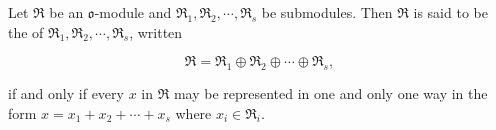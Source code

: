 Let $\mathfrak{R}$ be an $\mathfrak{o}$-module and $\mathfrak{R}_1, \mathfrak{R}_2, \cdots, \mathfrak{R}_s$ be submodules. Then $\mathfrak{R}$ is said to be the  of $\mathfrak{R}_1, \mathfrak{R}_2, \cdots, \mathfrak{R}_s$, written

$$\mathfrak{R} = \mathfrak{R}_1 \oplus \mathfrak{R}_2 \oplus \cdots \oplus \mathfrak{R}_s,$$

if and only if every $x$ in $\mathfrak{R}$ may be represented in one and only one way in the form $x = x_1 + x_2 + \cdots + x_s$ where $x_i \in \mathfrak{R}_i$.
